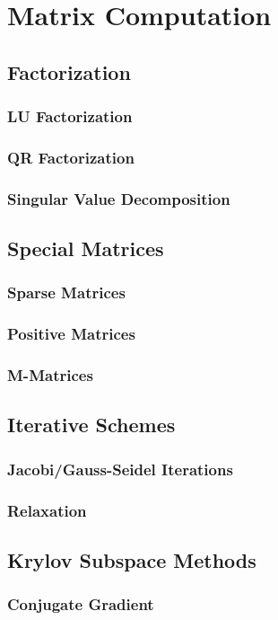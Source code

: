 \chapter{Matrix Computation}
\label{Ch: 8-Mat-Com}
\section{Factorization}
\subsection{LU Factorization}
\subsection{QR Factorization}
\subsection{Singular Value Decomposition}
\section{Special Matrices}
\subsection{Sparse Matrices}
\subsection{Positive Matrices}
\subsection{M-Matrices}
\section{Iterative Schemes}
\subsection{Jacobi/Gauss-Seidel Iterations}
\subsection{Relaxation}
\newpage
\section{Krylov Subspace Methods}
\subsection{Conjugate Gradient}

